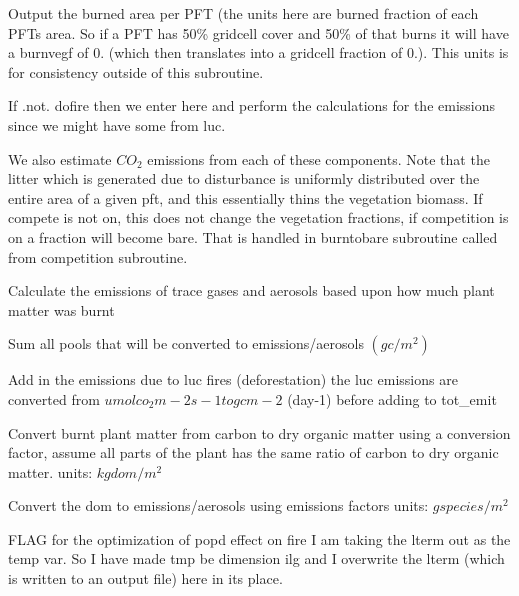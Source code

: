 Output the burned area per P\+F\+T (the units here are burned fraction of each P\+F\+Ts area. So if a P\+F\+T has 50\% gridcell cover and 50\% of that burns it will have a burnvegf of 0. (which then translates into a gridcell fraction of 0.). This units is for consistency outside of this subroutine.

If .not. dofire then we enter here and perform the calculations for the emissions since we might have some from luc.

We also estimate $CO_2$ emissions from each of these components. Note that the litter which is generated due to disturbance is uniformly distributed over the entire area of a given pft, and this essentially thins the vegetation biomass. If compete is not on, this does not change the vegetation fractions, if competition is on a fraction will become bare. That is handled in burntobare subroutine called from competition subroutine.

Calculate the emissions of trace gases and aerosols based upon how much plant matter was burnt

Sum all pools that will be converted to emissions/aerosols $(g c/m^2)$

Add in the emissions due to luc fires (deforestation) the luc emissions are converted from $umol co_2 m-2 s-1 to g c m-2$ (day-\/1) before adding to tot\+\_\+emit

Convert burnt plant matter from carbon to dry organic matter using a conversion factor, assume all parts of the plant has the same ratio of carbon to dry organic matter. units\+: $kg dom / m^2$

Convert the dom to emissions/aerosols using emissions factors units\+: $g species / m^2$

F\+L\+A\+G for the optimization of popd effect on fire I am taking the lterm out as the \textquotesingle{}temp\textquotesingle{} var. So I have made tmp be dimension ilg and I overwrite the lterm (which is written to an output file) here in its place. 